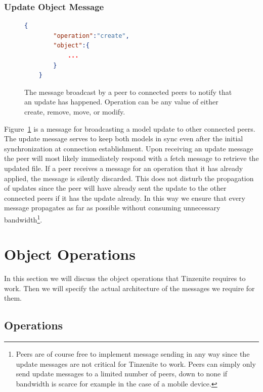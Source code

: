 \subsubsection{Update Object Message}
\label{subs:Update Object Message}

\begin{figure}[htp]
    \begin{lstlisting}[language=json,firstnumber=0]
    {
        "operation":"create",
        "object":{
            ...
        }
    }
    \end{lstlisting}
\caption[Update Object Message]{The message broadcast by a peer to connected peers to notify that an update has happened. Operation can be any value of either create, remove, move, or modify.}
\label{json:update_object}
\end{figure}

Figure~\ref{json:update_object} is a message for broadcasting a model update to other connected peers.
The update message serves to keep both models in sync even after the initial synchronization at connection establishment.
Upon receiving an update message the peer will most likely immediately respond with a fetch message to retrieve the updated file.
If a peer receives a message for an operation that it has already applied, the message is silently discarded.
This does not disturb the propagation of updates since the peer will have already sent the update to the other connected peers if it has the update already.
In this way we ensure that every message propagates as far as possible without consuming unnecessary bandwidth\footnote{Peers are of course free to implement message sending in any way since the update messages are not critical for Tinzenite to work. Peers can simply only send update messages to a limited number of peers, down to none if bandwidth is scarce for example in the case of a mobile device.}.

\section{Object Operations}
\label{sec:Object Operations}

In this section we will discuss the object operations that Tinzenite requires to work.
Then we will specify the actual architecture of the messages we require for them.

\subsection{Operations}
\label{sub:Operations}

